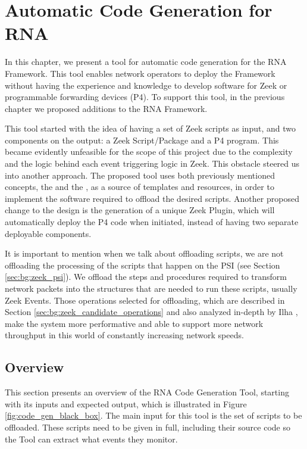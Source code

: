 \chapter{Automatic Code Generation for RNA}
\label{cap:code_gen}


In this chapter, we present a tool for automatic code generation for the RNA Framework. This tool enables network operators to deploy the Framework without having the experience and knowledge to develop software for Zeek or programmable forwarding devices (P4). To support this tool, in the previous chapter we proposed additions to the RNA Framework.

This tool started with the idea of having a set of Zeek scripts as input, and two components on the output: a Zeek Script/Package and a P4 program. This became evidently unfeasible for the scope of this project due to the complexity and the logic behind each event triggering logic in Zeek. This obstacle steered us into another approach. The proposed tool uses both previously mentioned concepts, the \ProtocolTemplates{} and the \Offloaders{}, as a source of templates and resources, in order to implement the software required to offload the desired scripts. Another proposed change to the design is the generation of a unique Zeek Plugin, which will automatically deploy the P4 code when initiated, instead of having two separate deployable components.

It is important to mention when we talk about offloading scripts, we are not offloading the processing of the scripts that happen on the PSI (see Section \ref{sec:bg:zeek_psi}). We offload the steps and procedures required to transform network packets into the structures that are needed to run these scripts, usually Zeek Events. Those operations selected for offloading, which are described in Section \ref{sec:bg:zeek_candidate_operations} and also analyzed in-depth by Ilha \cite{Ilha2022}, make the system more performative and able to support more network throughput in this world of constantly increasing network speeds.

\section{Overview}
\label{sec:code_gen:overview}

This section presents an overview of the RNA Code Generation Tool, starting with its inputs and expected output, which is illustrated in Figure \ref{fig:code_gen_black_box}. The main input for this tool is the set of scripts to be offloaded. These scripts need to be given in full, including their source code so the Tool can extract what events they monitor.

